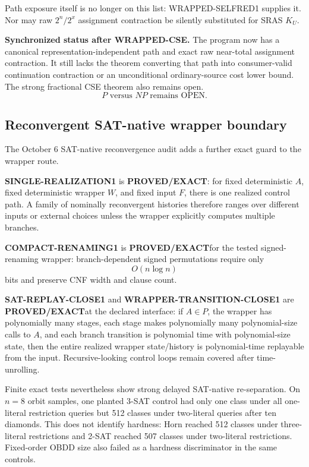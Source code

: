\documentclass[11pt]{article}
\newcommand{\statusproved}{\textcolor{proved}{\textbf{PROVED/EXACT}}}
\theoremstyle{plain}
\theoremstyle{definition}
\theoremstyle{remark}
\begin{document}
Path exposure itself is no longer on this list: WRAPPED-SELFRED1 supplies it.
Nor may raw \(2^n/2^x\) assignment contraction be silently substituted for
SRAS \(K_U\).

\begin{statusbox}
\textbf{Synchronized status after WRAPPED-CSE.}
The program now has a canonical representation-independent path and exact raw
near-total assignment contraction.  It still lacks the theorem converting
that path into consumer-valid continuation contraction or an unconditional
ordinary-source cost lower bound.  The strong fractional CSE theorem also
remains open.
\[
\boxed{\text{$P$ versus $NP$ remains OPEN.}}
\]
\end{statusbox}

\subsection{Reconvergent SAT-native wrapper boundary}

The October 6 SAT-native reconvergence audit adds a further exact guard to
the wrapper route.

\textbf{SINGLE-REALIZATION1} is \statusproved: for fixed deterministic
\(A\), fixed deterministic wrapper \(W\), and fixed input \(F\), there is one
realized control path.  A family of nominally reconvergent histories therefore
ranges over different inputs or external choices unless the wrapper explicitly
computes multiple branches.

\textbf{COMPACT-RENAMING1} is \statusproved for the tested signed-renaming
wrapper: branch-dependent signed permutations require only
\[
O(n\log n)
\]
bits and preserve CNF width and clause count.

\textbf{SAT-REPLAY-CLOSE1} and \textbf{WRAPPER-TRANSITION-CLOSE1} are
\statusproved at the declared interface: if \(A\in P\), the wrapper has
polynomially many stages, each stage makes polynomially many polynomial-size
calls to \(A\), and each branch transition is polynomial time with
polynomial-size state, then the entire realized wrapper state/history is
polynomial-time replayable from the input.  Recursive-looking control loops
remain covered after time-unrolling.

Finite exact tests nevertheless show strong delayed SAT-native
re-separation.  On \(n=8\) orbit samples, one planted 3-SAT control had only
one class under all one-literal restriction queries but 512 classes under
two-literal queries after ten diamonds.  This does not identify hardness:
Horn reached 512 classes under three-literal restrictions and 2-SAT reached
507 classes under two-literal restrictions.  Fixed-order OBDD size also
failed as a hardness discriminator in the same controls.
\end{document}
